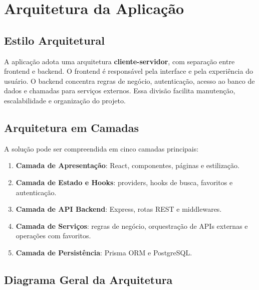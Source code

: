 \documentclass[
    12pt,
    oneside,
    openright,
    a4paper,
    english,
    brazil
]{abntex2}
\begin{document}

\chapter{Arquitetura da Aplicação}

\section{Estilo Arquitetural}

A aplicação adota uma arquitetura \textbf{cliente-servidor}, com separação entre frontend e backend. O frontend é responsável pela interface e pela experiência do usuário. O backend concentra regras de negócio, autenticação, acesso ao banco de dados e chamadas para serviços externos. Essa divisão facilita manutenção, escalabilidade e organização do projeto.

\section{Arquitetura em Camadas}

A solução pode ser compreendida em cinco camadas principais:

\begin{enumerate}
    \item \textbf{Camada de Apresentação}: React, componentes, páginas e estilização.
    \item \textbf{Camada de Estado e Hooks}: providers, hooks de busca, favoritos e autenticação.
    \item \textbf{Camada de API Backend}: Express, rotas REST e middlewares.
    \item \textbf{Camada de Serviços}: regras de negócio, orquestração de APIs externas e operações com favoritos.
    \item \textbf{Camada de Persistência}: Prisma ORM e PostgreSQL.
\end{enumerate}

\section{Diagrama Geral da Arquitetura}
\end{document}

